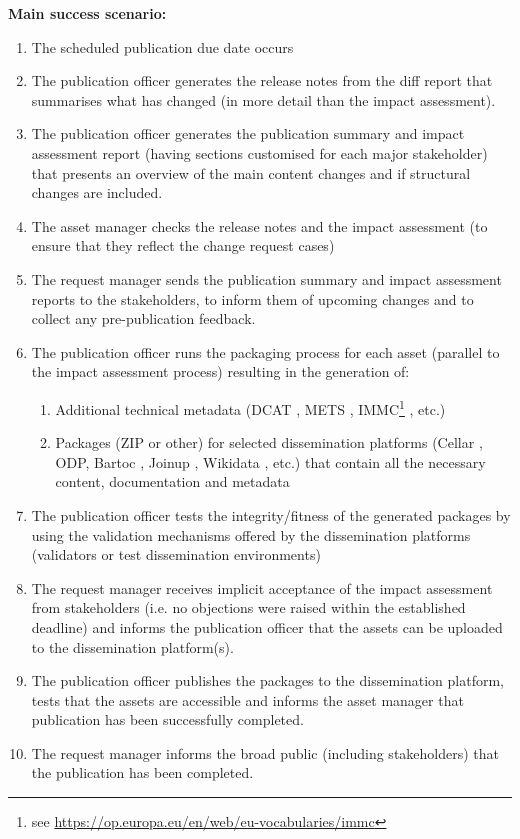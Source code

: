 	\textbf{Main success scenario:} 
	
	\begin{enumerate}
		\item The scheduled publication due date occurs
		\item The publication officer generates the release notes from the diff report that summarises what has changed (in more detail than the impact assessment).
		\item The publication officer generates the publication summary and impact assessment report (having sections customised for each major stakeholder) that presents an overview of the main content changes and if structural changes are included. 
		\item The asset manager checks the release notes and the impact assessment (to ensure that they reflect the change request cases)
		\item The request manager sends the publication summary and impact assessment reports to the stakeholders, to inform them of upcoming changes and to collect any pre-publication feedback.
		\item The publication officer runs the packaging process for each asset (parallel to the impact assessment process) resulting in the generation of: 
		\begin{enumerate}
			\item Additional technical metadata (DCAT \citep{dcat2}, METS \citep{mets}, IMMC\footnote{see \url{https://op.europa.eu/en/web/eu-vocabularies/immc}} , etc.)
			\item Packages (ZIP or other) for selected dissemination platforms (Cellar \citep{cdm-francesconi2015ontology}, ODP, Bartoc \citep{ledl2016describing}, Joinup \citep{hillenius2013free}, Wikidata \citep{vrandevcic2014wikidata}, etc.) that contain all the necessary content, documentation and metadata
		\end{enumerate}
		\item The publication officer tests the integrity/fitness of the generated packages by using the validation mechanisms offered by the dissemination platforms (validators or test dissemination environments)
		\item The request manager receives implicit acceptance of the impact assessment from stakeholders (i.e. no objections were raised within the established deadline) and informs the publication officer that the assets can be uploaded to the dissemination platform(s). 
		\item The publication officer publishes the packages to the dissemination platform, tests that the assets are accessible and informs the asset manager that publication has been successfully completed.
		\item The request manager informs the broad public (including stakeholders) that the publication has been completed.
		
	\end{enumerate}
	
